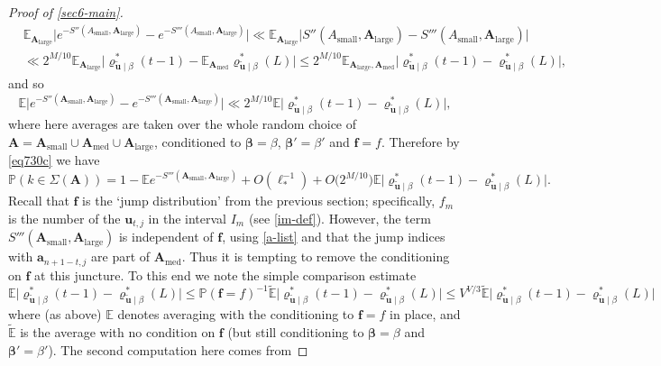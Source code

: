 \documentclass[11pt,reqno]{amsart}
\numberwithin{equation}{section}
\theoremstyle{definition}
\theoremstyle{remark}
\newcommand{\mb}{\mathbb}
\newcommand{\mbf}{\mathbf}
\def\boldbeta{\boldsymbol\beta}
\renewcommand{\le}{\leqslant}
\def\sml{\operatorname{small}}
\def\lrg{\operatorname{large}}
\def\med{\operatorname{med}}
\begin{document}
\begin{proof}[Proof of \cref{sec6-main}]
\begin{align*}\nonumber
& \mb{E}_{\mbf{A}_{\lrg}} \big|   e^{-S''(A_{\sml},\mbf{A}_{\lrg})}   - e^{-S'''(A_{\sml},\mbf{A}_{\lrg})}\big|  \ll \mb{E}_{\mbf{A}_{\lrg}} \big|  S''(A_{\sml}, \mbf{A}_{\lrg})  - S'''(A_{\sml}, \mbf{A}_{\lrg})\big| \\ & \ll 2^{M/10} \mb{E}_{\mbf{A}_{\lrg}} \big| \varrho^*_{\tilde{\mbf{u}} \mid \beta}(t-1) - \mb{E}_{\mbf{A}_{\med}} 
\varrho^*_{\tilde{\mbf{u}} \mid \beta}(L) \big| \le 
2^{M/10} \mb{E}_{\mbf{A}_{\lrg}, \mbf{A}_{\med}} \big| \varrho^*_{\tilde{\mbf{u}} \mid \beta}(t-1) - \varrho^*_{\tilde{\mbf{u}} \mid \beta}(L)\big|,\nonumber \end{align*}
and so
\begin{equation*}\mb{E} \big|   e^{-S''(\mbf{A}_{\sml}, \mbf{A}_{\lrg})}   - e^{-S'''(\mbf{A}_{\sml}, \mbf{A}_{\lrg})}\big| \ll 
2^{M/10} \mb{E} \big| \varrho^*_{\tilde{\mbf{u}} \mid \beta}(t-1) - \varrho^*_{\tilde{\mbf{u}} \mid \beta}(L)\big| ,\end{equation*} where here averages are taken over the whole random choice of $\mbf{A} = \mbf{A}_{\sml} \cup \mbf{A}_{\med} \cup \mbf{A}_{\lrg}$, conditioned to $\boldbeta = \beta$, $\boldbeta' = \beta'$ and $\mathbf{f} = f$. Therefore by \cref{eq730c} we have 
\begin{equation}\label{eq730d} \mb{P}(k \in \Sigma(\mbf{A})) =  1 - \mb{E} e^{-S'''(\mbf{A}_{\sml}, \mbf{A}_{\lrg})} + O(\ell_*^{-1}) + 
O \big( 2^{M/10} \big)\mb{E} \big| \varrho^*_{\tilde{\mbf{u}} \mid \beta}(t-1) - \varrho^*_{\tilde{\mbf{u}} \mid \beta}(L)\big|.\end{equation}
Recall that $\mbf{f}$ is the `jump distribution' from the previous section; specifically, $f_m$ is the number of the $\mbf{u}_{t,j}$ in the interval $I_m$ (see \cref{im-def}). However, the term $S'''(\mbf{A}_{\sml}, \mbf{A}_{\lrg})$ is independent of $\mbf{f}$, using \cref{a-list} and that the jump indices with $\mbf{a}_{n + 1 - t,j}$ are part of $\mbf{A}_{\med}$. Thus it is tempting to remove the conditioning on $\mbf{f}$ at this juncture. To this end we note the simple comparison estimate
\[
\mb{E} \big| \varrho^*_{\tilde{\mbf{u}} \mid \beta}(t-1) - \varrho^*_{\tilde{\mbf{u}} \mid \beta}(L)\big| \le \mb{P}(\mbf{f} = f)^{-1} \tilde{\mb{E}} \big| \varrho^*_{\tilde{\mbf{u}} \mid \beta}(t-1) - \varrho^*_{\tilde{\mbf{u}} \mid \beta}(L)\big| \le V^{V/3}\tilde{\mb{E}} \big| \varrho^*_{\tilde{\mbf{u}} \mid \beta}(t-1) - \varrho^*_{\tilde{\mbf{u}} \mid \beta}(L)\big|
\]
where (as above) $\mb{E}$ denotes averaging with the conditioning to $\mbf{f} = f$ in place, and $\tilde{\mb{E}}$ is the average with no condition on $\mbf{f}$ (but still conditioning to $\boldbeta = \beta$ and $\boldbeta' = \beta'$). The second computation here comes from

\end{proof}
\end{document}
